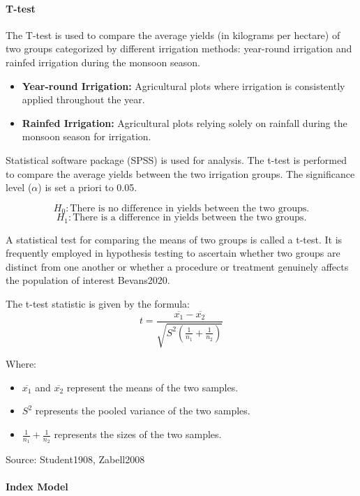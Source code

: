 \paragraph{T-test}


The T-test is used to compare the average yields (in kilograms per hectare) of two groups categorized by different irrigation methods: year-round irrigation and rainfed irrigation during the monsoon season.

\begin{itemize}
    \item \textbf{Year-round Irrigation:} Agricultural plots where irrigation is consistently applied throughout the year.
    \item \textbf{Rainfed Irrigation:} Agricultural plots relying solely on rainfall during the monsoon season for irrigation.
\end{itemize}

Statistical software package (SPSS) is used for analysis. The t-test is performed to compare the average yields between the two irrigation groups. The significance level ($\alpha$) is set a priori to 0.05.

\[
H_0: \text{There is no difference in yields between the two groups.}
\]
\[
H_1: \text{There is a difference in yields between the two groups.}
\]

A statistical test for comparing the means of two groups is called a t-test. It is frequently employed in hypothesis testing to ascertain whether two groups are distinct from one another or whether a procedure or treatment genuinely affects the population of interest Bevans2020.

The t-test statistic is given by the formula:
\[
t = \frac{\overline{x_1} - \overline{x_2}}{\sqrt{S^2 \left( \frac{1}{n_1} + \frac{1}{n_2} \right)}}
\]

Where:
\begin{itemize}
    \item $\overline{x_1}$ and $\overline{x_2}$ represent the means of the two samples.
    \item $S^2$ represents the pooled variance of the two samples.
    \item $\frac{1}{n_1} + \frac{1}{n_2}$ represents the sizes of the two samples.
\end{itemize}

Source: Student1908, Zabell2008

\paragraph{Index Model}

